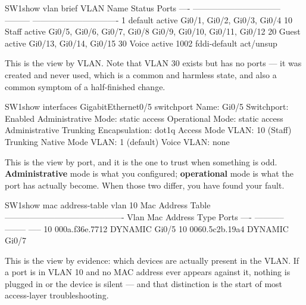 \begin{verify}{SW1}{show vlan brief}
VLAN Name                             Status    Ports
---- -------------------------------- --------- -------------------------------
1    default                          active    Gi0/1, Gi0/2, Gi0/3, Gi0/4
10   Staff                            active    Gi0/5, Gi0/6, Gi0/7, Gi0/8
                                                Gi0/9, Gi0/10, Gi0/11, Gi0/12
20   Guest                            active    Gi0/13, Gi0/14, Gi0/15
30   Voice                            active
1002 fddi-default                     act/unsup
\end{verify}

This is the view by VLAN. Note that VLAN 30 exists but has no ports --- it was
created and never used, which is a common and harmless state, and also a common
symptom of a half-finished change.

\begin{verify}{SW1}{show interfaces GigabitEthernet0/5 switchport}
Name: Gi0/5
Switchport: Enabled
Administrative Mode: static access
Operational Mode: static access
Administrative Trunking Encapsulation: dot1q
Access Mode VLAN: 10 (Staff)
Trunking Native Mode VLAN: 1 (default)
Voice VLAN: none
\end{verify}

This is the view by port, and it is the one to trust when something is odd.
\textbf{Administrative} mode is what you configured; \textbf{operational} mode is
what the port has actually become. When those two differ, you have found your
fault.

\begin{verify}{SW1}{show mac address-table vlan 10}
          Mac Address Table
-------------------------------------------
Vlan    Mac Address       Type        Ports
----    -----------       --------    -----
  10    000a.f36e.7712    DYNAMIC     Gi0/5
  10    0060.5c2b.19a4    DYNAMIC     Gi0/7
\end{verify}

This is the view by evidence: which devices are actually present in the VLAN. If
a port is in VLAN 10 and no MAC address ever appears against it, nothing is
plugged in or the device is silent --- and that distinction is the start of most
access-layer troubleshooting.

